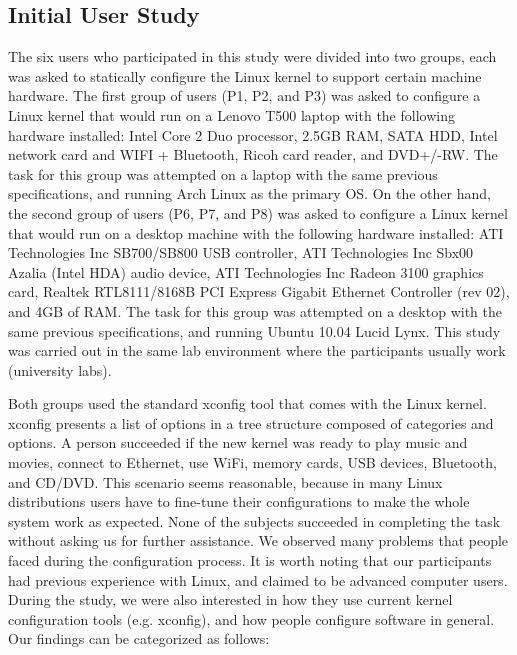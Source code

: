 \documentclass{chi2009}
\begin{document}
\subsection{Initial User Study}
The six users who participated in this study were divided into two groups, each was asked to statically configure the Linux kernel to support certain machine
hardware. The first group of users (P1, P2, and P3) was asked to configure a Linux kernel that would run on a Lenovo T500 laptop with the following hardware
installed: Intel Core 2 Duo processor, 2.5GB RAM, SATA HDD, Intel network card and WIFI + Bluetooth, Ricoh card reader, and DVD+/-RW. The task for this group
was attempted on a laptop with the same previous specifications, and running Arch Linux as the primary OS. On the other hand, the second group of users (P6, P7,
and P8) was asked to configure a Linux kernel that would run on a desktop machine with the following hardware installed: ATI Technologies Inc SB700/SB800 USB
controller, ATI Technologies Inc Sbx00 Azalia (Intel HDA) audio device, ATI Technologies Inc Radeon 3100 graphics card, Realtek RTL8111/8168B PCI Express
Gigabit Ethernet Controller (rev 02), and 4GB of RAM. The task for this group was attempted on a desktop with the same previous specifications, and running
Ubuntu 10.04 Lucid Lynx. This study was carried out in the same lab environment where the participants usually work (university labs).

Both groups used the standard \textsf{xconfig} tool that comes with the Linux kernel. \textsf{xconfig} presents a list of options in a tree structure composed
of categories and options. A person succeeded if the new kernel was ready to play music and movies, connect to Ethernet, use WiFi, memory cards, USB devices,
Bluetooth, and CD/DVD. This scenario seems reasonable, because in many Linux distributions users have to fine-tune their configurations to make the whole system
work as expected. None of the subjects succeeded in completing the task without asking us for further assistance. We observed many problems that people faced
during the configuration process. It is worth noting that our participants had previous experience with Linux, and claimed to be advanced computer users. During
the study, we were also interested in how they use current kernel configuration tools (e.g. \textsf{xconfig}), and how people configure software in general. Our
findings can be categorized as follows:
\end{document}
